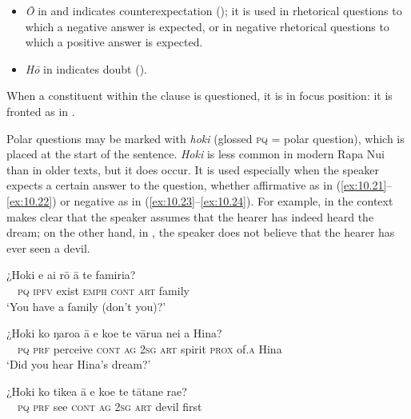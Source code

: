 \begin{itemize}
\item 
\textit{{\ꞌ}Ō} in  and  indicates counterexpectation (); it is used in rhetorical questions to which a negative answer is expected, or in negative rhetorical questions to which a positive answer is expected.

\item 
\textit{Hō} in  indicates doubt ().

\end{itemize}

When a constituent within the clause is questioned, it is in focus position: it is fronted as in .

Polar questions may be marked with \textit{hoki} (glossed \textsc{pq} = polar question), which is placed at the start of the sentence. \textit{Hoki} is less common in modern Rapa Nui than in older texts, but it does occur. It is used especially when the speaker expects a certain answer to the question, whether affirmative as in (\ref{ex:10.21}–\ref{ex:10.22}) or negative as in (\ref{ex:10.23}–\ref{ex:10.24}). For example, in  the context makes clear that the speaker assumes that the hearer has indeed heard the dream; on the other hand, in , the speaker does not believe that the hearer has ever seen a devil.

\ea\label{ex:10.21}
\gll ¿Hoki e ai rō {\ꞌ}ā te famiria? \\
~~\textsc{pq} \textsc{ipfv} exist \textsc{emph} \textsc{cont} \textsc{art} family \\

\glt 
‘You have a family (don’t you)?’ \textstyleExampleref{[R103.093]} 
\z

\ea\label{ex:10.22}
\gll ¿Hoki ko ŋaro{\ꞌ}a {\ꞌ}ā e koe te vārua nei {\ꞌ}a Hina? \\
~~\textsc{pq} \textsc{prf} perceive \textsc{cont} \textsc{ag} \textsc{2sg} \textsc{art} spirit \textsc{prox} of\textsc{.a} Hina \\

\glt 
‘Did you hear Hina’s dream?’ \textstyleExampleref{[R313.087]} 
\z

\ea\label{ex:10.23}
\gll ¿Hoki ko tike{\ꞌ}a {\ꞌ}ā e koe te tātane ra{\ꞌ}e? \\
~~\textsc{pq} \textsc{prf} see \textsc{cont} \textsc{ag} \textsc{2sg} \textsc{art} devil first \\

